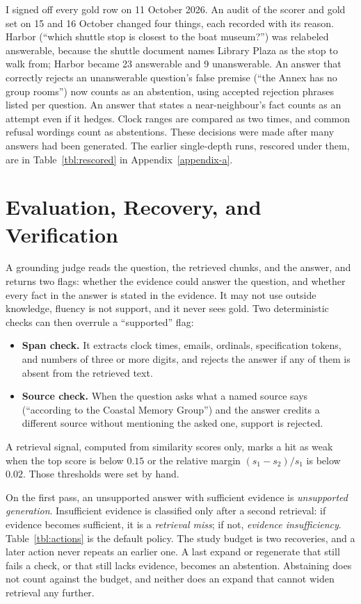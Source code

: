 \documentclass[12pt, a4paper, oneside]{report}
\newcommand{\code}[1]{\texttt{\detokenize{#1}}}
\begin{document}
I signed off every gold row on 11 October 2026. An audit of the scorer and
gold set on 15 and 16 October changed four things, each recorded with its
reason. Harbor \code{seed-007} (``which shuttle stop is closest to the boat
museum?'') was relabeled answerable, because the shuttle document names
Library Plaza as the stop to walk from; Harbor became 23 answerable and 9
unanswerable. An answer that correctly rejects an unanswerable question's
false premise (``the Annex has no group rooms'') now counts as an
abstention, using accepted rejection phrases listed per question. An answer
that states a near-neighbour's fact counts as an attempt even if it hedges.
Clock ranges are compared as two times, and common refusal wordings count as
abstentions. These decisions were made after many answers had been generated. The
earlier single-depth runs, rescored under them, are in
Table~\ref{tbl:rescored} in Appendix~\ref{appendix-a}.

\section{Evaluation, Recovery, and Verification}

A grounding judge reads the question, the retrieved chunks, and the answer,
and returns two flags: whether the evidence could answer the question, and
whether every fact in the answer is stated in the evidence. It may not use
outside knowledge, fluency is not support, and it never sees gold. Two
deterministic checks can then overrule a ``supported'' flag:
\begin{itemize}
\item \textbf{Span check.} It extracts clock times, emails, ordinals,
  specification tokens, and numbers of three or more digits, and rejects
  the answer if any of them is absent from the retrieved text.
\item \textbf{Source check.} When the question asks what a named source
  says (``according to the Coastal Memory Group'') and the answer credits a
  different source without mentioning the asked one, support is rejected.
\end{itemize}

A retrieval signal, computed from similarity scores only, marks a hit as
weak when the top score is below $0.15$ or the relative margin
$(s_1-s_2)/s_1$ is below $0.02$. Those thresholds were set by hand.

On the first pass, an unsupported answer with sufficient evidence is
\emph{unsupported generation}. Insufficient evidence is classified only
after a second retrieval: if evidence becomes sufficient, it is a
\emph{retrieval miss}; if not, \emph{evidence insufficiency}.
Table~\ref{tbl:actions} is the default policy. The study budget is two
recoveries, and a later action never repeats an earlier one. A last expand
or regenerate that still fails a check, or that still lacks evidence,
becomes an abstention. Abstaining does not count against the budget, and
neither does an expand that cannot widen retrieval any further.
\end{document}
